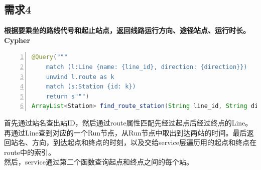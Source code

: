 \documentclass[11pt,a4paper]{article}
\begin{document}
\subsection{需求4}
\textbf{根据要乘坐的路线代号和起止站点，返回线路运行方向、途径站点、运行时长。} \\
\textbf{Cypher} \\
\begin{lstlisting}[numbers = left, 
showstringspaces=false,
showspaces = false,
breaklines = true, 
language=Java]
@Query("""
	match (l:Line {name: {line_id}, direction: {direction}})
	unwind l.route as k
	match (s:Station {id: k})
	return s""")
ArrayList<Station> find_route_station(String line_id, String direction);
\end{lstlisting} 
首先通过站名查出站ID，然后通过route属性匹配先经过起点后经过终点的Line。再通过Line查到对应的一个Run节点，从Run节点中取出到达两站的时间。最后返回站名、方向，到达起点和终点的时刻，以及交给service层遍历用的起点和终点在route中的索引。 \\
然后，service通过第二个函数查询起点和终点之间的每个站。
\end{document}
